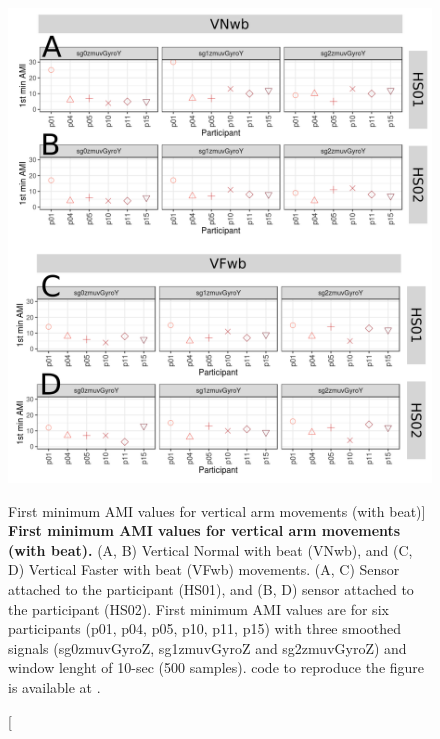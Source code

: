 \begin{figure}
\centering
\includegraphics[width=1.0\textwidth]{ami_Vwb_w10}
	\caption
	[First minimum AMI values for vertical arm movements (with beat)]{
	{\bf First minimum AMI values for vertical arm movements (with beat).}
		(A, B) Vertical Normal with beat (VNwb), and 
		(C, D) Vertical Faster with beat (VFwb) movements.
		(A, C) Sensor attached to the participant (HS01), and
		(B, D) sensor attached to the participant (HS02).
		First minimum AMI values are for six participants 
		(p01, p04, p05, p10, p11, p15) with three smoothed 
		signals (sg0zmuvGyroZ, sg1zmuvGyroZ and sg2zmuvGyroZ) and 
		window lenght of 10-sec (500 samples).
		\R code to reproduce the figure is available at 
		.
        }
    \label{fig:amiVwb}
\end{figure}












